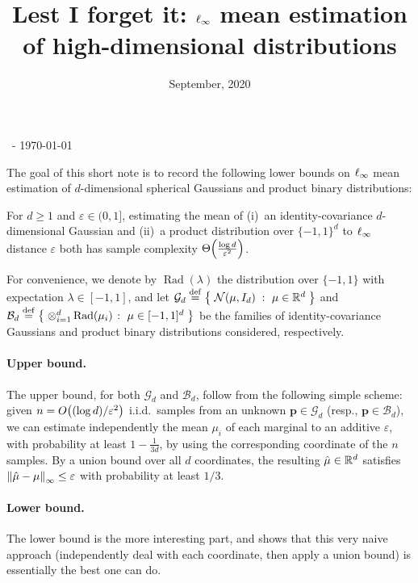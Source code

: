 \documentclass[10pt]{article}
\title{Lest I forget it: $\lp[\infty]$ mean estimation of high-dimensional distributions}
\date{September, 2020}
\newcommand{\dst}{\varepsilon}
\newcommand{\ns}{n}
\newcommand{\dims}{d}
\newcommand{\p}{\mathbf{p}}
\begin{document}
\begin{flushleft}\sf\footnotesize
\makeatletter
\@date~- \today \hfill \@title
\makeatother
\end{flushleft}
\vspace{5mm}

The goal of this short note is to record the following lower bounds on $\lp[\infty]$ mean estimation of $\dims$-dimensional spherical Gaussians and product binary distributions:
\begin{theorem}
  For $\dims\geq 1$ and $\dst\in(0,1]$, estimating the mean of (i)~an identity-covariance $\dims$-dimensional Gaussian and (ii)~a product distribution over $\{-1,1\}^\dims$ to $\lp[\infty]$ distance $\dst$ both has sample complexity $\bigTheta{\frac{\log\dims}{\dst^2}}$.
\end{theorem}
For convenience, we denote by $\operatorname{Rad}(\lambda)$ the distribution over $\{-1,1\}$ with expectation $\lambda\in[-1,1]$, and let $\mathcal{G}_\dims \eqdef \setOfSuchThat{\gaussian{\mu}{I_\dims}}{\mu\in\R^\dims}$ and $\mathcal{B}_\dims \eqdef \setOfSuchThat{ \otimes_{i=1}^\dims \operatorname{Rad}(\mu_i) }{\mu\in[-1,1]^\dims}$ be the families of identity-covariance Gaussians and product binary distributions considered, respectively.

\paragraph{Upper bound.} The upper bound, for both $\mathcal{G}_\dims$ and $\mathcal{B}_\dims$, follow from the following simple scheme: given $\ns=\bigO{(\log\dims)/\dst^2}$ i.i.d.\ samples from an unknown $\p\in\mathcal{G}_\dims$ (resp., $\p\in\mathcal{B}_\dims$), we can estimate independently the mean $\mu_i$ of each marginal to an additive $\dst$, with probability at least $1-\frac{1}{3\dims}$, by using the corresponding coordinate of the $\ns$ samples. By a union bound over all $\dims$ coordinates, the resulting $\hat{\mu}\in\R^\dims$ satisfies $\norminf{\hat{\mu}-\mu} \leq \dst$ with probability at least $1/3$.

\paragraph{Lower bound.} The lower bound is the more interesting part, and shows that this very naive approach (independently deal with each coordinate, then apply a union bound) is essentially the best one can do.
\end{document}
